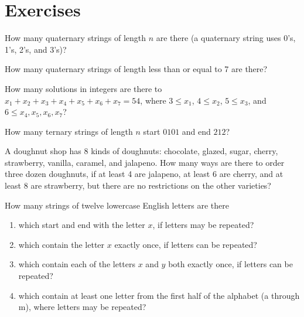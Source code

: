 \clearpage
\section{Exercises}

\begin{exer}
How many quaternary strings of length $n$ are there (a quaternary string uses 0's, 1's, 2's, and 3's)?
\end{exer}

\begin{exer}
How many quaternary strings of length less than or equal to 7 are there?
\end{exer}

\begin{exer}
How many solutions in integers are there to $x_1+x_2+x_3+x_4+x_5+x_6+x_7=54$, where $3\leq x_1$, $4\leq x_2$, $5\leq x_3$, and $6\leq x_4,x_5,x_6, x_7$?
\end{exer}

\begin{exer}
\begin{fullwidth}
How many ternary strings of length $n$ start $0101$ and end $212$?
\end{fullwidth}
\end{exer}

\begin{exer} 
A doughnut shop has 8 kinds of doughnuts: chocolate, glazed, sugar, cherry, strawberry, vanilla, caramel, and jalapeno. How many ways are there to order three 
dozen doughnuts, if at least 4 are jalapeno, at least 6 are cherry, and at least 8 are strawberry, but there are no restrictions on the other varieties?
\end{exer}

\begin{exer}

How many strings of twelve lowercase English letters are there\\
\begin{enumerate}[label=(\alph*)]
 \item which start and end with the letter $x$, if letters may be repeated?
 \item which contain the letter $x$ exactly once, if letters can be repeated?
 \item which contain each of the letters $x$ and $y$ both exactly once, if letters can be repeated?
 \item which contain at least one letter from the first half of the alphabet (a through m), where letters may be repeated?
\end{enumerate}

\end{exer}


